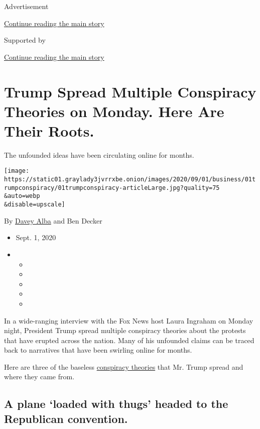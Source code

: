 Advertisement

\protect\hyperlink{after-top}{Continue reading the main story}

Supported by

\protect\hyperlink{after-sponsor}{Continue reading the main story}

\hypertarget{trump-spread-multiple-conspiracy-theories-on-monday-here-are-their-roots}{%
\section{Trump Spread Multiple Conspiracy Theories on Monday. Here Are
Their
Roots.}\label{trump-spread-multiple-conspiracy-theories-on-monday-here-are-their-roots}}

The unfounded ideas have been circulating online for months.

\texttt{[image: https://static01.graylady3jvrrxbe.onion/images/2020/09/01/business/01trumpconspiracy/01trumpconspiracy-articleLarge.jpg?quality=75\\\&auto=webp\\\&disable=upscale]}

By \href{https://www.nytimes3xbfgragh.onion/by/davey-alba}{Davey Alba}
and Ben Decker

\begin{itemize}
\item
  Sept. 1, 2020
\item
  \begin{itemize}
  \item
  \item
  \item
  \item
  \item
  \end{itemize}
\end{itemize}

In a wide-ranging interview with the Fox News host Laura Ingraham on
Monday night, President Trump spread multiple conspiracy theories about
the protests that have erupted across the nation. Many of his unfounded
claims can be traced back to narratives that have been swirling online
for months.

Here are three of the baseless
\href{https://www.nytimes3xbfgragh.onion/2020/09/01/us/politics/trump-conspiracy-theory-thugs-plane.html}{conspiracy
theories} that Mr. Trump spread and where they came from.

\hypertarget{a-plane-loaded-with-thugs-headed-to-the-republican-convention}{%
\subsection{A plane `loaded with thugs' headed to the Republican
convention.}\label{a-plane-loaded-with-thugs-headed-to-the-republican-convention}}

